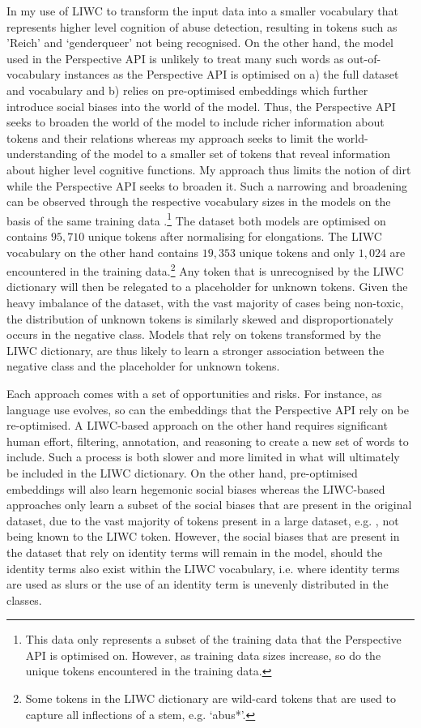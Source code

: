 In my use of LIWC to transform the input data into a smaller vocabulary that represents higher level cognition of abuse detection, resulting in tokens such as 'Reich' and `genderqueer' not being recognised.  
On the other hand, the model used in the Perspective API is unlikely to treat many such words as out-of-vocabulary instances as the Perspective API is optimised on a) the full dataset and vocabulary and b) relies on pre-optimised embeddings which further introduce social biases into the world of the model.  
Thus, the Perspective API seeks to broaden the world of the model to include richer information about tokens and their relations whereas my approach seeks to limit the world-understanding of the model to a smaller set of tokens that reveal information about higher level cognitive functions.  
My approach thus limits the notion of dirt while the Perspective API seeks to broaden it.  
Such a narrowing and broadening can be observed through the respective vocabulary sizes in the models on the basis of the same training data \citep{Wulczyn:2017}.\footnote{This data only represents a subset of the training data that the Perspective API is optimised on. However, as training data sizes increase, so do the unique tokens encountered in the training data.}  
The dataset both models are optimised on contains $95,710$ unique tokens after normalising for elongations.  
The LIWC vocabulary on the other hand contains $19,353$ unique tokens and only $1,024$ are encountered in the training data.\footnote{Some tokens in the LIWC dictionary are wild-card tokens that are used to capture all inflections of a stem, e.g. `abus*'.}  
Any token that is unrecognised by the LIWC dictionary will then be relegated to a placeholder for unknown tokens.  
Given the heavy imbalance of the dataset, with the vast majority of cases being non-toxic, the distribution of unknown tokens is similarly skewed and disproportionately occurs in the negative class.  
Models that rely on tokens transformed by the LIWC dictionary, are thus likely to learn a stronger association between the negative class and the placeholder for unknown tokens.  
  
Each approach comes with a set of opportunities and risks.  
For instance, as language use evolves, so can the embeddings that the Perspective API rely on be re-optimised.  
A LIWC-based approach on the other hand requires significant human effort, filtering, annotation, and reasoning to create a new set of words to include.  
Such a process is both slower and more limited in what will ultimately be included in the LIWC dictionary.  
On the other hand, pre-optimised embeddings will also learn hegemonic social biases \citep{Bender:2021} whereas the LIWC-based approaches only learn a subset of the social biases that are present in the original dataset, due to the vast majority of tokens present in a large dataset, e.g. \citep{Wulczyn:2017}, not being known to the LIWC token.  
However, the social biases that are present in the dataset that rely on identity terms will remain in the model, should the identity terms also exist within the LIWC vocabulary, i.e. where identity terms are used as slurs or the use of an identity term is unevenly distributed in the classes.  
  
